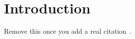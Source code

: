 \section{Introduction}
\label{sec:intro}

Remove this once you add a real citation~\citep{AliceETAL42DumbBib}.
